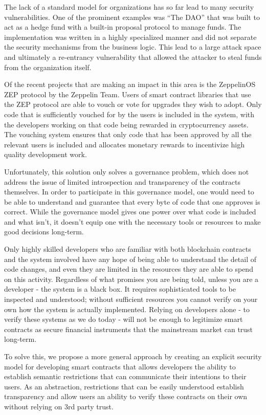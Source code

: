 \documentclass[english,a4paper]{article}
\begin{document}
The lack of a standard model for organizations has so far lead to many
security vulnerabilities. One of the prominent examples was ``The DAO''
that was built to act as a hedge fund with a built-in proposal protocol
to manage funds. The implementation was written in a highly specialized
manner and did not separate the security mechanisms from the business
logic. This lead to a large attack space and ultimately a re-entrancy
vulnerability that allowed the attacker to steal funds from the
organization itself.

Of the recent projects that are making an impact in this area is the
ZeppelinOS ZEP protocol by the Zeppelin Team. Users of smart contract
libraries that use the ZEP protocol are able to vouch or vote for
upgrades they wish to adopt. Only code that is sufficiently vouched for
by the users is included in the system, with the developers working on
that code being rewarded in cryptocurrency assets. The vouching system
ensures that only code that has been approved by all the relevant users
is included and allocates monetary rewards to incentivize high quality
development work.

Unfortunately, this solution only solves a governance problem, which
does not address the issue of limited introspection and transparency of
the contracts themselves. In order to participate in this governance
model, one would need to be able to understand and guarantee that every
byte of code that one approves is correct. While the governance model
gives one power over what code is included and what isn't, it doesn't
equip one with the necessary tools or resources to make good decisions
long-term.

Only highly skilled developers who are familiar with both blockchain
contracts and the system involved have any hope of being able to
understand the detail of code changes, and even they are limited in the
resources they are able to spend on this activity. Regardless of what
promises you are being told, unless you are a developer - the system is
a black box. It requires sophisticated tools to be inspected and
understood; without sufficient resources you cannot verify on your own
how the system is actually implemented. Relying on developers alone - to
verify these systems as we do today - will not be enough to legitimize
smart contracts as secure financial instruments that the mainstream
market can trust long-term.

To solve this, we propose a more general approach by creating an
explicit security model for developing smart contracts that allows
developers the ability to establish semantic restrictions that can
communicate their intentions to their users. As an abstraction,
restrictions that can be easily understood establish transparency and
allow users an ability to verify these contracts on their own without
relying on 3rd party trust.
\end{document}

